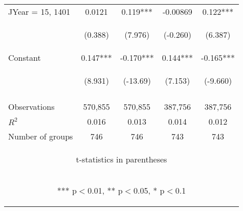 \documentclass[]{article}
\begin{document}
\begin{center}
\begin{tabular}{lcccc}
JYear = 15, 1401 & 0.0121 & 0.119*** & -0.00869 & 0.122*** \\
\vspace{4pt} & \begin{footnotesize}(0.388)\end{footnotesize} & \begin{footnotesize}(7.976)\end{footnotesize} & \begin{footnotesize}(-0.260)\end{footnotesize} & \begin{footnotesize}(6.387)\end{footnotesize} \\
Constant & 0.147*** & -0.170*** & 0.144*** & -0.165*** \\
 & \begin{footnotesize}(8.931)\end{footnotesize} & \begin{footnotesize}(-13.69)\end{footnotesize} & \begin{footnotesize}(7.153)\end{footnotesize} & \begin{footnotesize}(-9.660)\end{footnotesize} \\
\vspace{4pt} & \begin{footnotesize}\end{footnotesize} & \begin{footnotesize}\end{footnotesize} & \begin{footnotesize}\end{footnotesize} & \begin{footnotesize}\end{footnotesize} \\
Observations & 570,855 & 570,855 & 387,756 & 387,756 \\
$R^2$ & 0.016 & 0.013 & 0.014 & 0.012 \\
 Number of groups & 746 & 746 & 743 & 743 \\ \hline
\multicolumn{5}{c}{\begin{footnotesize} t-statistics in parentheses\end{footnotesize}} \\
\multicolumn{5}{c}{\begin{footnotesize} *** p$<$0.01, ** p$<$0.05, * p$<$0.1\end{footnotesize}} \\
\end{tabular}
\end{center}
\end{document}
